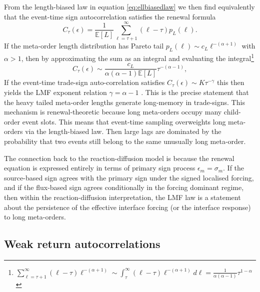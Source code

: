 \documentclass[5p,final]{elsarticle}
\begin{document}
From the length-biased law in equation \ref{eq:ellbiasedlaw} we then find equivalently that the event-time sign autocorrelation satisfies the renewal formula 
\begin{equation}
    C_\tau (\epsilon)=\frac{1}{\mathbb E[L]}\sum_{\ell=\tau+1}^{\infty}(\ell-\tau)p_L(\ell).
\end{equation}
If the meta-order length distribution has Pareto tail $p_L(\ell)\sim c_L\ell^{-(\alpha+1)}$ with $\alpha>1$, then by approximating the sum as an integral and evaluating the integral\footnote{
$\sum_{\ell=\tau+1}^{\infty}(\ell-\tau)\ell^{-(\alpha+1)}
\sim
\int_\tau^{\infty}(\ell-\tau)\ell^{-(\alpha+1)}d\ell
=
\frac{1}{\alpha(\alpha-1)}\tau^{1-\alpha}$}
\begin{equation}
    C_\tau(\epsilon)\sim \frac{c_L}{\alpha(\alpha-1)\mathbb E[L]}\tau^{-(\alpha-1)},
\end{equation}
If the event-time trade-sign auto-correlation satisfies $C_{\tau}(\epsilon) \sim K \tau^{-\gamma}$ this then yields the LMF exponent relation $\gamma=\alpha-1$ \cite{lillo2005theory,sato2023prl,sato2024jsp}. This is the precise statement that the heavy tailed meta-order lengths generate long-memory in trade-signs. This mechanism is renewal-theoretic because long meta-orders occupy many child-order event slots. This means that event-time sampling overweights long meta-orders via the length-biased law. Then large lags are dominated by the probability that two events still belong to the same unusually long meta-order. 

The connection back to the reaction-diffusion model is because the renewal equation is expressed entirely in terms of primary sign process $\epsilon_m =\sigma_m$. If the source-based sign agrees with the primary sign under the signed localised forcing, and if the flux-based sign agrees conditionally in the forcing dominant regime, then within the reaction-diffusion interpretation, the LMF law is a statement about the persistence of the effective interface forcing (or the interface response) to long meta-orders. 

\subsection{Weak return autocorrelations} \label{sec:efficiency}

\end{document}
